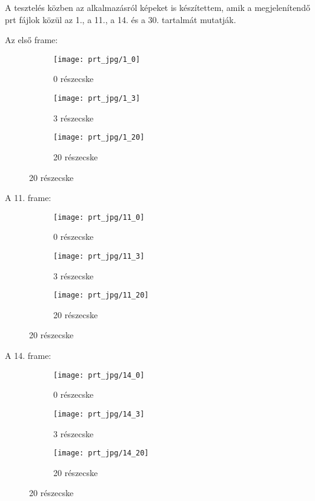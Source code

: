 A tesztelés közben az alkalmazásról képeket is készítettem,
amik a megjelenítendő prt fájlok közül az 1., a 11., a 14. 
és a 30. tartalmát mutatják.

\noindent Az első frame:
\begin{figure}[!htb]
    \centering
    \begin{subfigure}[!htb]{0.32\textwidth}
        \centering
        \texttt{[image: prt\_jpg/1\_0]}
        \caption{0 részecske}
    \end{subfigure}
    \hfill
    \begin{subfigure}[!htb]{0.32\textwidth}
        \centering
        \texttt{[image: prt\_jpg/1\_3]}
        \caption{3 részecske}
    \end{subfigure}
    \hfill
    \begin{subfigure}[!htb]{0.32\textwidth}
        \centering
        \texttt{[image: prt\_jpg/1\_20]}
        \caption{20 részecske}
    \end{subfigure}
    \label{Az 1. frame}
\end{figure}

\clearpage
\noindent A 11. frame:
\begin{figure}[!htb]
    \centering
    \begin{subfigure}[!htb]{0.32\textwidth}
        \centering
        \texttt{[image: prt\_jpg/11\_0]}
        \caption{0 részecske}
    \end{subfigure}
    \hfill
    \begin{subfigure}[!htb]{0.32\textwidth}
        \centering
        \texttt{[image: prt\_jpg/11\_3]}
        \caption{3 részecske}
    \end{subfigure}
    \hfill
    \begin{subfigure}[!htb]{0.32\textwidth}
        \centering
        \texttt{[image: prt\_jpg/11\_20]}
        \caption{20 részecske}
    \end{subfigure}
\end{figure}

\noindent A 14. frame:
\begin{figure}[!htb]
    \centering
    \begin{subfigure}[!htb]{0.32\textwidth}
        \centering
        \texttt{[image: prt\_jpg/14\_0]}
        \caption{0 részecske}
    \end{subfigure}
    \hfill
    \begin{subfigure}[!htb]{0.32\textwidth}
        \centering
        \texttt{[image: prt\_jpg/14\_3]}
        \caption{3 részecske}
    \end{subfigure}
    \hfill
    \begin{subfigure}[!htb]{0.32\textwidth}
        \centering
        \texttt{[image: prt\_jpg/14\_20]}
        \caption{20 részecske}
    \end{subfigure}
\end{figure}

